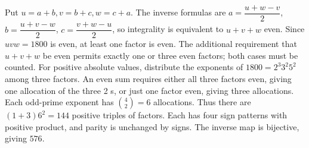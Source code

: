 Put $u=a+b,v=b+c,w=c+a$. The inverse formulas are $a=\dfrac{u+w-v}{2}$, $b=\dfrac{u+v-w}{2}$, $c=\dfrac{v+w-u}{2}$, so integrality is equivalent to $u+v+w$ even. Since $uvw=1800$ is even, at least one factor is even. The additional requirement that $u+v+w$ be even permits exactly one or three even factors; both cases must be counted. For positive absolute values, distribute the exponents of $1800=2^3 3^2 5^2$ among three factors. An even sum requires either all three factors even, giving one allocation of the three 2 s, or just one factor even, giving three allocations. Each odd-prime exponent has $\binom42=6$ allocations. Thus there are $(1+3)6^2=144$ positive triples of factors. Each has four sign patterns with positive product, and parity is unchanged by signs. The inverse map is bijective, giving $\boxed{576}$.
